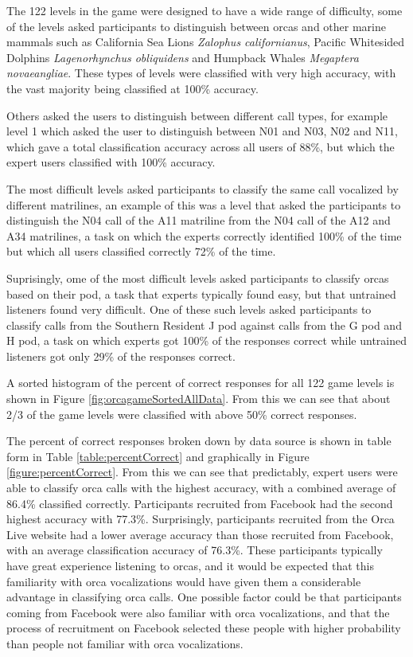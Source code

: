 \documentclass[12pt,oneside]{book}
\begin{document}
The 122 levels in the game were designed to have a wide range of
difficulty, some of the levels asked participants to distinguish
between orcas and other marine mammals such as California Sea Lions
\textit{Zalophus californianus}, Pacific Whitesided Dolphins
\textit{Lagenorhynchus obliquidens} and Humpback Whales
\textit{Megaptera novaeangliae}.  These types of levels were
classified with very high accuracy, with the vast majority being
classified at 100\% accuracy.  

Others asked the users to distinguish between different call types,
for example level 1 which asked the user to distinguish between N01
and N03, N02 and N11, which gave a total classification accuracy
across all users of 88\%, but which the expert users classified with
100\% accuracy.

The most difficult levels asked participants to classify the same call
vocalized by different matrilines, an example of this was a level that
asked the participants to distinguish the N04 call of the A11
matriline from the N04 call of the A12 and A34 matrilines, a task on
which the experts correctly identified 100\% of the time but which all
users classified correctly 72\% of the time.

Suprisingly, ome of the most difficult levels asked participants to
classify orcas based on their pod, a task that experts typically found
easy, but that untrained listeners found very difficult.  One of these
such levels asked participants to classify calls from the Southern
Resident J pod against calls from the G pod and H pod, a task on which
experts got 100\% of the responses correct while untrained listeners
got only 29\% of the responses correct.

A sorted histogram of the percent of correct responses for all 122
game levels is shown in Figure \ref{fig:orcagameSortedAllData}.  From
this we can see that about 2/3 of the game levels were classified with
above 50\% correct responses.

The percent of correct responses broken down by data source is shown
in table form in Table \ref{table:percentCorrect} and graphically in
Figure \ref{figure:percentCorrect}.  From this we can see that
predictably, expert users were able to classify orca calls with the
highest accuracy, with a combined average of 86.4\% classified
correctly.  Participants recruited from Facebook had the second
highest accuracy with 77.3\%.  Surprisingly, participants recruited
from the Orca Live website had a lower average accuracy than those
recruited from Facebook, with an average classification accuracy of
76.3\%.  These participants typically have great experience listening
to orcas, and it would be expected that this familiarity with orca
vocalizations would have given them a considerable advantage in
classifying orca calls.  One possible factor could be that
participants coming from Facebook were also familiar with orca
vocalizations, and that the process of recruitment on Facebook
selected these people with higher probability than people not familiar
with orca vocalizations.
\end{document}

